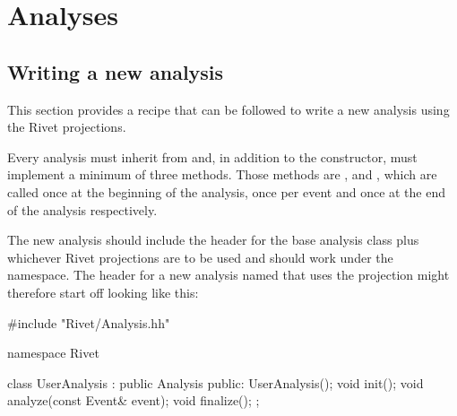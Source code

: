 \documentclass{JHEP3}
\begin{document}





\section{Analyses}

\subsection{Writing a new analysis}

This section provides a recipe that can be followed to write a new analysis
using the Rivet projections.

Every analysis must inherit from  and, in addition to the
constructor, must implement a minimum of three methods.  Those methods are
,  and , which
are called once at the beginning of the analysis, once per event and once at the
end of the analysis respectively.

The new analysis should include the header for the base analysis class plus
whichever Rivet projections are to be used and should work under the
 namespace.  The header for a new analysis named 
that uses the  projection might therefore start off looking
like this:
%
\begin{snippet}
#include "Rivet/Analysis.hh"

namespace Rivet {

  class UserAnalysis : public Analysis {
  public:
    UserAnalysis();
    void init();
    void analyze(const Event& event);
    void finalize();
  };

}
\end{snippet}
\end{document}
